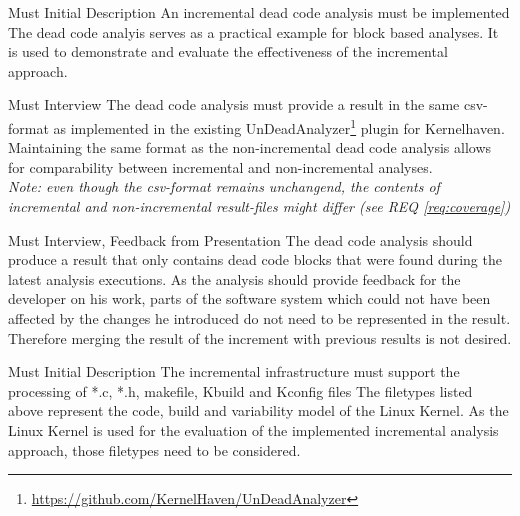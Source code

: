 \documentclass[a4paper]{article}
\begin{document}
\begin{req} \label{req:dead-code-analysis}
\reqtable
	{Must}  {Initial Description}
	{An incremental dead code analysis must be implemented}
	{The dead code analyis serves as a practical example for block based analyses. It is used to demonstrate and evaluate the effectiveness of the incremental approach.}
	\vspace{1em}
	\begin{subreq} \label{req:format}
    \reqtable
    {Must}  {Interview}
	{The dead code analysis must provide a result in the same csv-format as implemented in the existing UnDeadAnalyzer\footnote{\url{https://github.com/KernelHaven/UnDeadAnalyzer}} plugin for Kernelhaven.}
	{Maintaining the same format as the non-incremental dead code analysis allows for comparability between incremental and non-incremental analyses. \\
	\emph{Note: even though the csv-format remains unchangend, the contents of incremental and non-incremental result-files might differ (see REQ \ref{req:coverage})}}
	\end{subreq}
	\vspace{1em}
	\begin{subreq} \label{req:coverage}
    \reqtable
    {Must}  {Interview, Feedback from Presentation}
	{The dead code analysis should produce a result that only contains dead code blocks that were found during the latest analysis executions.}
	{As the analysis should provide feedback for the developer on his work, parts of the software system which could not have been affected by the changes he introduced do not need to be represented in the result. Therefore merging the result of the increment with previous results is not desired.}
	\end{subreq}
\end{req}
\vspace{1em}

\begin{req} \label{req:target-artifacts}
\reqtable
    {Must}  {Initial Description}
	{The incremental infrastructure must support the processing of *.c, *.h, makefile, Kbuild and Kconfig files}
	{The filetypes listed above represent the code, build and variability model of the Linux Kernel. As the Linux Kernel is used for the evaluation of the implemented incremental analysis approach, those filetypes need to be considered.}
\end{req}
\end{document}
